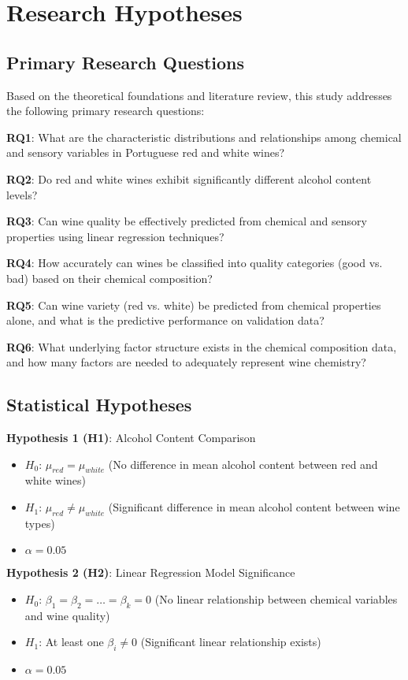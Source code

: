 \chapter{Research Hypotheses}

\section{Primary Research Questions}

Based on the theoretical foundations and literature review, this study addresses the following primary research questions:

\textbf{RQ1}: What are the characteristic distributions and relationships among chemical and sensory variables in Portuguese red and white wines?

\textbf{RQ2}: Do red and white wines exhibit significantly different alcohol content levels?

\textbf{RQ3}: Can wine quality be effectively predicted from chemical and sensory properties using linear regression techniques?

\textbf{RQ4}: How accurately can wines be classified into quality categories (good vs. bad) based on their chemical composition?

\textbf{RQ5}: Can wine variety (red vs. white) be predicted from chemical properties alone, and what is the predictive performance on validation data?

\textbf{RQ6}: What underlying factor structure exists in the chemical composition data, and how many factors are needed to adequately represent wine chemistry?

\section{Statistical Hypotheses}

\textbf{Hypothesis 1 (H1)}: Alcohol Content Comparison
\begin{itemize}
	\item $H_0$: $\mu_{red} = \mu_{white}$ (No difference in mean alcohol content between red and white wines)
	\item $H_1$: $\mu_{red} \neq \mu_{white}$ (Significant difference in mean alcohol content between wine types)
	\item $\alpha = 0.05$
\end{itemize}

\textbf{Hypothesis 2 (H2)}: Linear Regression Model Significance
\begin{itemize}
	\item $H_0$: $\beta_1 = \beta_2 = \ldots = \beta_k = 0$ (No linear relationship between chemical variables and wine quality)
	\item $H_1$: At least one $\beta_i \neq 0$ (Significant linear relationship exists)
	\item $\alpha = 0.05$
\end{itemize}

